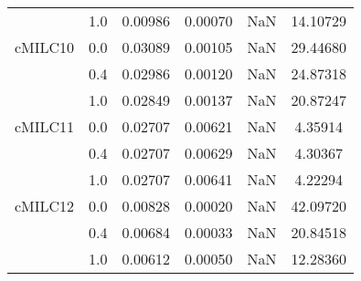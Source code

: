 \begin{longtable}{cccccc}
     & 1.0 & 0.00986 & 0.00070 & NaN & 14.10729 \\
cMILC10 & 0.0 & 0.03089 & 0.00105 & NaN & 29.44680 \\
     & 0.4 & 0.02986 & 0.00120 & NaN & 24.87318 \\
     & 1.0 & 0.02849 & 0.00137 & NaN & 20.87247 \\
cMILC11 & 0.0 & 0.02707 & 0.00621 & NaN & 4.35914 \\
     & 0.4 & 0.02707 & 0.00629 & NaN & 4.30367 \\
     & 1.0 & 0.02707 & 0.00641 & NaN & 4.22294 \\
cMILC12 & 0.0 & 0.00828 & 0.00020 & NaN & 42.09720 \\
     & 0.4 & 0.00684 & 0.00033 & NaN & 20.84518 \\
     & 1.0 & 0.00612 & 0.00050 & NaN & 12.28360 \\
\end{longtable}
